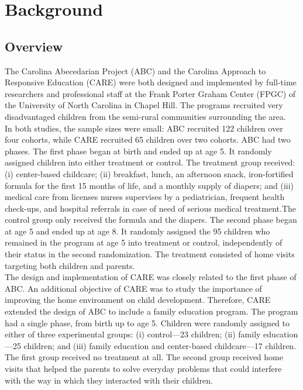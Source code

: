 \singlespacing
\pagebreak
\tableofcontents
\listoffigures
\listoftables
\pagebreak

\section{Background} \label{section:bakcground}
\subsection{Overview}

\noindent The Carolina Abecedarian Project (ABC) and the Carolina Approach to Responsive Education (CARE) were both designed and implemented by full-time researchers and professional staff at the Frank Porter Graham Center (FPGC) of the University of North Carolina in Chapel Hill. The programs recruited very disadvantaged children from the semi-rural communities surrounding the area.\\

\noindent In both studies, the sample sizes were small: ABC recruited 122 children over four cohorts, while CARE recruited 65 children over two cohorts. ABC had two phases. The first phase began at birth and ended up at age 5. It randomly assigned children into either treatment or control. The treatment group received: (i) center-based childcare; (ii) breakfast, lunch, an afternoon snack, iron-fortified formula for the first 15 months of life, and a monthly supply of diapers; and (iii) medical care from licenses nurses supervises by a pediatrician, frequent health check-ups, and hospital referrals in case of need of serious medical treatment.The control group only received the formula and the diapers. The second phase began at age 5 and ended up at age 8. It randomly assigned the 95 children who remained in the program at age 5 into treatment or control, independently of their status in the second randomization. The treatment consisted of home visits targeting both children and parents.\\ 

\noindent The design and implementation of CARE was closely related to the first phase of ABC. An additional objective of CARE was to study the importance of improving the home environment on child development. Therefore, CARE extended the design of ABC to include a family education program. The program had a single phase, from birth up to age 5. Children were randomly assigned to either of three experimental groups: (i) control---23 children; (ii) family education---25 children; and (iii) family education and center-based childcare---17 children. The first group received no treatment at all. The second group received home visits that helped the parents to solve everyday problems that could interfere with the way in which they interacted with their children.\\

